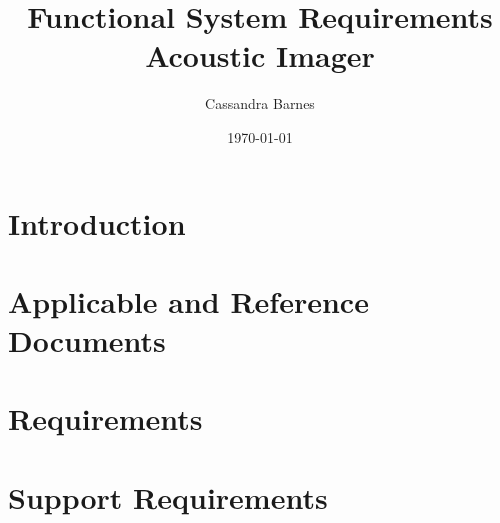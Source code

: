 \documentclass[12pt]{article}  %
\title{Functional System Requirements\\Acoustic Imager}
\author{Cassandra Barnes}
\date{\today}
\begin{document}
\maketitle 


\pagebreak 

\section*{Introduction}


\section*{Applicable and Reference Documents}


\section*{Requirements}


\section*{Support Requirements}
\end{document}
